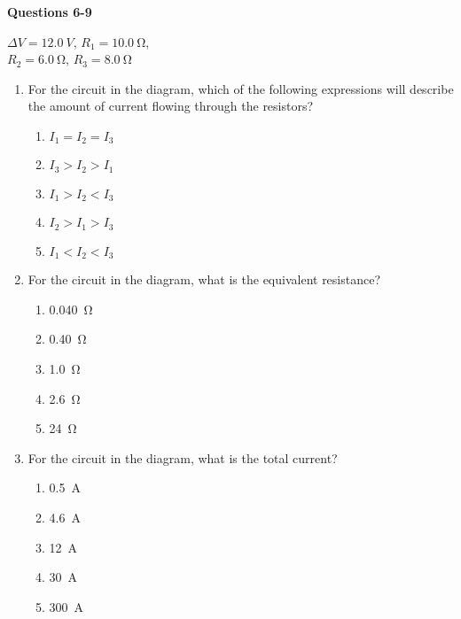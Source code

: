 \documentclass{../../oss-apphys}
\begin{document}
\begin{multicols}{2}
  \textbf{Questions 6-9}
  \begin{center}
    
    \vspace{.1in}$\Delta V=\SI{12.0}{V}$, $R_1=\SI{10.0}{\ohm}$,\\
    $R_2=\SI{6.0}{\ohm}$, $R_3=\SI{8.0}{\ohm}$
  \end{center}

  \begin{enumerate}[leftmargin=18pt,resume]
  \item For the circuit in the diagram, which of the following expressions will
    describe the amount of current flowing through the resistors?
    \begin{enumerate}[noitemsep,topsep=0pt,leftmargin=18pt,label=(\Alph*)]
    \item $I_1=I_2=I_3$
    \item $I_3>I_2>I_1$
    \item $I_1>I_2<I_3$
    \item $I_2>I_1>I_3$
    \item $I_1<I_2<I_3$
    \end{enumerate}
    
  \item For the circuit in the diagram, what is the equivalent resistance?
    \begin{enumerate}[noitemsep,topsep=0pt,leftmargin=18pt,label=(\Alph*)]
      \item\SI{0.040}{\ohm}
      \item\SI{0.40}{\ohm}
      \item\SI{1.0}{\ohm}
      \item\SI{2.6}{\ohm}
      \item\SI{24}{\ohm}
    \end{enumerate}
    
  \item For the circuit in the diagram, what is the total current?
    \begin{enumerate}[noitemsep,topsep=0pt,leftmargin=18pt,label=(\Alph*)]
    \item\SI{0.5}{A}
    \item\SI{4.6}{A}
    \item\SI{12}{A}
    \item\SI{30}{A}
    \item\SI{300}{A}
    \end{enumerate}
    

\end{enumerate}
\end{multicols}
\end{document}
